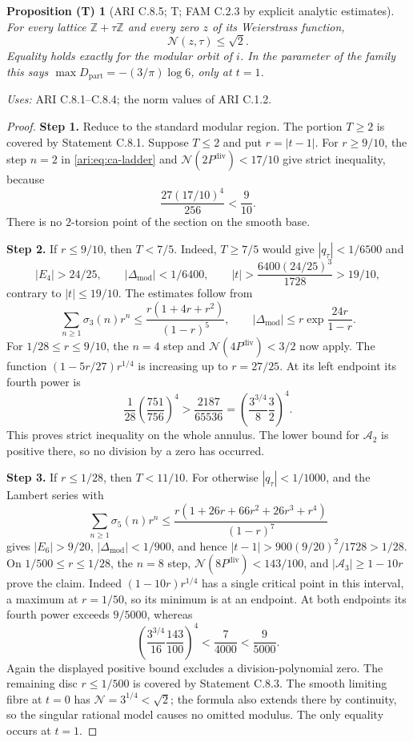 \documentclass[11pt,a4paper]{article}
\theoremstyle{plain}
\newtheorem{proposition}[theorem]{Proposition (T)}
\theoremstyle{definition}
\newcommand{\Z}{\mathbb Z}
\begin{document}
\begin{proposition}[ARI C.8.5; T; FAM C.2.3 by explicit analytic estimates]\label{ari:C.8.5}
For every lattice $\Z+\tau\Z$ and every zero $z$ of its
Weierstrass function,
\[
 \mathcal N(z,\tau)\le\sqrt2.
\]
Equality holds exactly for the modular orbit of $i$.
In the parameter of the family this says
$\max D_{\mathrm{part}}=-(3/\pi)\log6$, only at $t=1$.
\end{proposition}
\noindent\textit{Uses:} ARI C.8.1--C.8.4; the norm values of ARI C.1.2.\par
\begin{proof}
\noindent\textbf{Step 1.} Reduce to the standard modular region. The portion $T\ge2$
is covered by Statement C.8.1. Suppose $T\le2$ and put
$r=|t-1|$. For $r\ge9/10$, the step $n=2$ in
\eqref{ari:eq:ca-ladder} and $\mathcal N(2P^{\mathrm{div}})<17/10$ give strict inequality,
because
\[
 \frac{27(17/10)^4}{256}<\frac9{10}.
\]
There is no $2$-torsion point of the section on the smooth base.


\noindent\textbf{Step 2.} If $r\le9/10$, then $T<7/5$. Indeed, $T\ge7/5$ would give
$|q_\tau|<1/6500$ and
\[
 |E_4|>24/25,\qquad |\Delta_{\mathrm{mod}}|<1/6400,
 \qquad |t|>\frac{6400(24/25)^3}{1728}>19/10,
\]
contrary to $|t|\le19/10$. The estimates follow from
\[
 \sum_{n\ge1}\sigma_3(n)r^n
 \le\frac{r(1+4r+r^2)}{(1-r)^5},\qquad
 |\Delta_{\mathrm{mod}}|\le r\exp\frac{24r}{1-r}.
\]
For $1/28\le r\le9/10$, the $n=4$ step and
$\mathcal N(4P^{\mathrm{div}})<3/2$ now apply. The function
$(1-5r/27)r^{1/4}$ is increasing up to $r=27/25$.
At its left endpoint its fourth power is
\[
 \frac1{28}\left(\frac{751}{756}\right)^4
 >\frac{2187}{65536}
 =\left(\frac{3^{3/4}}8\frac32\right)^4.
\]
This proves strict inequality on the whole annulus. The lower
bound for $\mathcal A_2$ is positive there, so no division by a zero has
occurred.


\noindent\textbf{Step 3.} If $r\le1/28$, then $T<11/10$. For otherwise $|q_\tau|<1/1000$,
and the Lambert series with
\[
 \sum_{n\ge1}\sigma_5(n)r^n
 \le\frac{r(1+26r+66r^2+26r^3+r^4)}{(1-r)^7}
\]
gives $|E_6|>9/20$, $|\Delta_{\mathrm{mod}}|<1/900$, and hence
$|t-1|>900(9/20)^2/1728>1/28$.
On $1/500\le r\le1/28$, the $n=8$ step,
$\mathcal N(8P^{\mathrm{div}})<143/100$, and $|\mathcal A_3|\ge1-10r$ prove the claim.
Indeed $(1-10r)r^{1/4}$ has a single critical point in this
interval, a maximum at $r=1/50$, so its minimum is at an endpoint.
At both endpoints its fourth power exceeds $9/5000$, whereas
\[
 \left(\frac{3^{3/4}}{16}\frac{143}{100}\right)^4
 <\frac7{4000}<\frac9{5000}.
\]
Again the displayed positive bound excludes a division-polynomial
zero. The remaining disc $r\le1/500$ is covered by Statement
C.8.3. The smooth limiting fibre at $t=0$ has
$\mathcal N=3^{1/4}<\sqrt2$; the formula also extends there by
continuity, so the singular rational model causes no omitted
modulus. The only equality occurs at $t=1$.
\end{proof}
\end{document}
